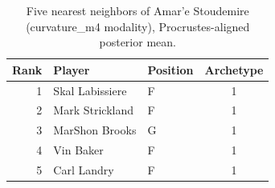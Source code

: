 \begin{table}[htbp]
  \centering\small
  \begin{tabular}{rllc}
    \toprule
    Rank & Player & Position & Archetype \\
    \midrule
    1 & Skal Labissiere & F & 1 \\
    2 & Mark Strickland & F & 1 \\
    3 & MarShon Brooks & G & 1 \\
    4 & Vin Baker & F & 1 \\
    5 & Carl Landry & F & 1 \\
    \bottomrule
  \end{tabular}
  \caption{Five nearest neighbors of Amar'e Stoudemire (curvature_m4 modality), Procrustes-aligned posterior mean.}
  \label{tab:Amar_e_Stoudemire_neighbors_curvature_m4}
\end{table}

